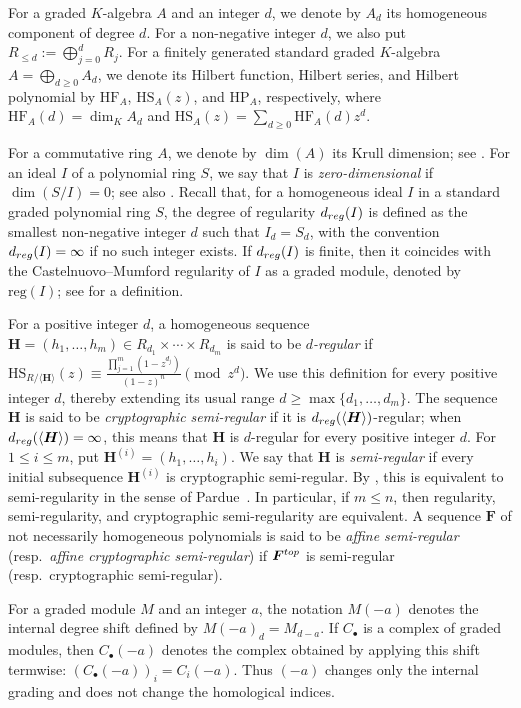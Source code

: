 \documentclass{article}
\theoremstyle{definition}
\theoremstyle{plain}
\theoremstyle{plain}
\theoremstyle{plain}
\theoremstyle{plain}
\numberwithin{equation}{subsection}
\begin{document}
For a graded $K$-algebra $A$ and an integer $d$, we denote by $A_d$ its homogeneous component of degree $d$.
For a non-negative integer $d$, we also put $R_{\leq d}:=\bigoplus_{j=0}^dR_j$.
For a finitely generated standard graded $K$-algebra $A=\bigoplus_{d\geq0}A_d$, we denote its Hilbert function, Hilbert series, and Hilbert polynomial by $\mathrm{HF}_A$, $\mathrm{HS}_A(z)$, and $\mathrm{HP}_A$, respectively, where $\mathrm{HF}_A(d)=\dim_K A_d$ and $\mathrm{HS}_A(z)=\sum_{d\geq0}\mathrm{HF}_A(d)z^d$.

For a commutative ring $A$, we denote by $\dim(A)$ its Krull dimension; see \cite[Section~10.2]{Eisen}.
For an ideal $I$ of a polynomial ring $S$, we say that $I$ is \emph{zero-dimensional} if $\dim(S/I)=0$; see also \cite[Chapter~IX]{CLO}.
Recall that, for a homogeneous ideal $I$ in a standard graded polynomial ring $S$, the degree of regularity $d_{\rm reg}(I)$ is defined as the smallest non-negative integer $d$ such that $I_d=S_d$, with the convention $d_{\rm reg}(I)=\infty$ if no such integer exists.
If $d_{\rm reg}(I)$ is finite, then it coincides with the Castelnuovo--Mumford regularity of $I$ as a graded module, denoted by $\mathrm{reg}(I)$; see \cite[Section~20.5]{Eisen} for a definition.

For a positive integer $d$, a homogeneous sequence $\bm H=(h_1,\ldots,h_m)\in R_{d_1}\times\cdots\times R_{d_m}$ is said to be \emph{$d$-regular} if $\mathrm{HS}_{R/\langle\bm H\rangle}(z) \equiv \frac{\prod_{j=1}^m(1-z^{d_j})}{(1-z)^n} \pmod{z^d}$.
We use this definition for every positive integer $d$, thereby extending its usual range $d\geq\max\{d_1,\ldots,d_m\}$.
The sequence $\bm H$ is said to be \emph{cryptographic semi-regular} if it is $d_{\rm reg}(\langle\bm H\rangle)$-regular;
when $d_{\rm reg}(\langle\bm H\rangle)=\infty$, this means that $\bm H$ is $d$-regular for every positive integer $d$.
For $1\leq i\leq m$, put $\bm H^{(i)}=(h_1,\ldots,h_i)$.
We say that $\bm H$ is \emph{semi-regular} if every initial subsequence $\bm H^{(i)}$ is cryptographic semi-regular.
By \cite[Propositions~1 and~3]{KY}, this is equivalent to semi-regularity in the sense of Pardue~\cite{Pardue}.
In particular, if $m\leq n$, then regularity, semi-regularity, and cryptographic semi-regularity are equivalent.
A sequence $\bm F$ of not necessarily homogeneous polynomials is said to be \emph{affine semi-regular} (resp.\ \emph{affine cryptographic semi-regular}) if $\bm F^{\rm top}$ is semi-regular (resp.\ cryptographic semi-regular).

For a graded module $M$ and an integer $a$, the notation $M(-a)$
denotes the internal degree shift defined by $M(-a)_d=M_{d-a}$.
If $C_\bullet$ is a complex of graded modules, then $C_\bullet(-a)$ denotes the complex obtained by applying this shift termwise: $(C_\bullet(-a))_i=C_i(-a)$.
Thus $(-a)$ changes only the internal grading and does not change the homological indices.
\end{document}
